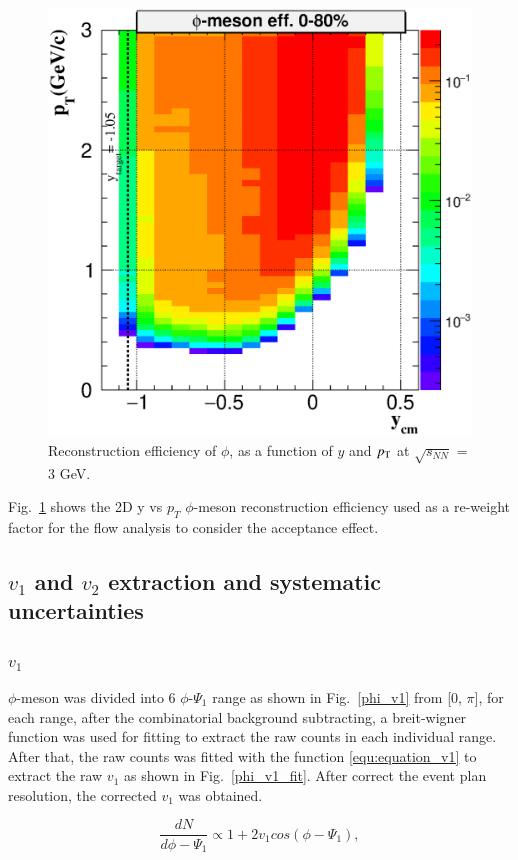 \begin{figure}[h]
\includegraphics[width=0.6\linewidth]{chapterY/fig/2effAll_rap_0.eps}
\caption{Reconstruction efficiency of $\phi$, as a function of $y$ and $p_{\rm{T}}$ at $\sqrt{s_{NN}}$ = 3 GeV.}
\label{phi_2Deff}
\end{figure}

Fig.~\ref{phi_2Deff} shows the 2D y vs $p_T$ $\phi$-meson reconstruction efficiency used as a re-weight factor for the flow analysis to consider the acceptance effect.


\subsection{$v_1$ and $v_2$ extraction and systematic uncertainties}

\subsubsection{$v_1$}

$\phi$-meson was divided into 6 $\phi$-$\Psi_{1}$ range as shown in Fig.~\ref{phi_v1} from [0, $\pi$], for each range, after the combinatorial background subtracting, a breit-wigner function was used for fitting to extract the raw counts in each individual range. After that, the raw counts was fitted with the function \ref{equ:equation_v1} to extract the raw $v_1$ as shown in Fig.~\ref{phi_v1_fit}. After correct the event plan resolution, the corrected $v_1$ was obtained.

\begin{equation}
  \frac{dN}{d\phi-\Psi_1} \propto 1+2v_1 cos(\phi-\Psi_{1}),
\label{equ:equation_v1}
\end{equation}


